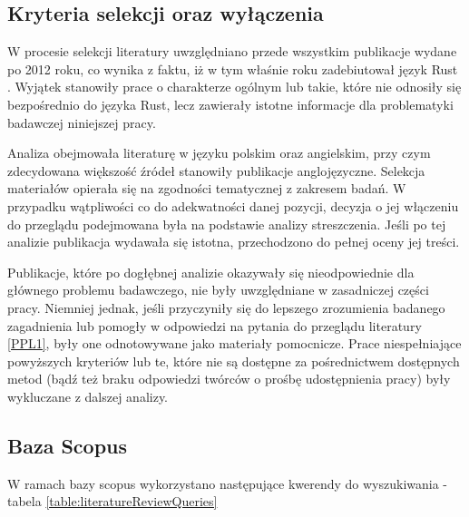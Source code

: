 \subsection{Kryteria selekcji oraz wyłączenia}
\label{KryteriaSelekcji}
W procesie selekcji literatury uwzględniano przede wszystkim publikacje wydane po 2012 roku, co wynika z faktu, iż w tym właśnie roku zadebiutował język Rust \cite{wikipediaRustprogramming}. Wyjątek stanowiły prace o charakterze ogólnym lub takie, które nie odnosiły się bezpośrednio do języka Rust, lecz zawierały istotne informacje dla problematyki badawczej niniejszej pracy.

Analiza obejmowała literaturę w języku polskim oraz angielskim, przy czym zdecydowana większość źródeł stanowiły publikacje anglojęzyczne. Selekcja materiałów opierała się na zgodności tematycznej z zakresem badań. W przypadku wątpliwości co do adekwatności danej pozycji, decyzja o jej włączeniu do przeglądu podejmowana była na podstawie analizy streszczenia. Jeśli po tej analizie publikacja wydawała się istotna, przechodzono do pełnej oceny jej treści.

Publikacje, które po dogłębnej analizie okazywały się nieodpowiednie dla głównego problemu badawczego, nie były uwzględniane w zasadniczej części pracy. Niemniej jednak, jeśli przyczyniły się do lepszego zrozumienia badanego zagadnienia lub pomogły w odpowiedzi na pytania do przeglądu literatury \ref{PPL1}, były one odnotowywane jako materiały pomocnicze. Prace niespełniające powyższych kryteriów lub te, które nie są dostępne za pośrednictwem dostępnych metod (bądź też braku odpowiedzi twórców o prośbę udostępnienia pracy) były wykluczane z dalszej analizy.


\subsection{Baza Scopus}
W ramach bazy scopus wykorzystano następujące kwerendy do wyszukiwania - tabela \ref{table:literatureReviewQueries}

